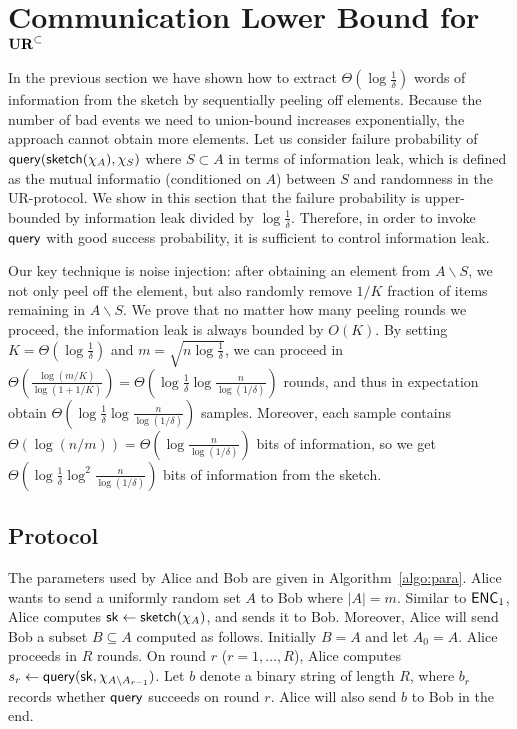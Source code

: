 \section{Communication Lower Bound for $\mathbf{UR}^\subset$} \label{sec:optimal-lb}

In the previous section we have shown how to extract $\Theta(\log \frac{1}{\delta})$ words of information from the sketch by sequentially peeling off elements. 
Because the number of bad events we need to union-bound increases exponentially, the approach cannot obtain more elements. 
Let us consider failure probability of $\mathsf{query}(\mathsf{sketch}(\chi_A), \chi_S)$ where $S\subset A$ in terms of information leak, which is defined as the mutual informatio (conditioned on $A$) between $S$ and randomness in the UR-protocol. 
We show in this section that the failure probability is upper-bounded by information leak divided by $\log \frac{1}{\delta}$. 
Therefore, in order to invoke $\mathsf{query}$ with good success probability, it is sufficient to control information leak.

Our key technique is noise injection: after obtaining an element from $A\backslash S$, we not only peel off the element, but also randomly remove $1/K$ fraction of items remaining in $A\backslash S$. 
We prove that no matter how many peeling rounds we proceed, the information leak is always bounded by $O(K)$. 
By setting $K=\Theta(\log \frac{1}{\delta})$ and $m=\sqrt{n\log\frac{1}{\delta}}$, we can proceed in $\Theta(\frac{\log (m/K)}{\log (1 +1/K)}) = \Theta(\log\frac{1}{\delta}\log\frac{n}{\log(1/\delta)})$ rounds, and thus in expectation obtain $\Theta(\log\frac{1}{\delta}\log\frac{n}{\log(1/\delta)})$ samples.
Moreover, each sample contains $\Theta(\log(n/m))=\Theta(\log \frac{n}{\log (1/\delta)})$ bits of information, so we get $\Theta(\log \frac{1}{\delta}\log^2 \frac{n}{\log (1/\delta)}) $ bits of information from the sketch. 

\subsection{Protocol}

The parameters used by Alice and Bob are given in Algorithm~\ref{algo:para}.
Alice wants to send a uniformly random set $A$ to Bob where $|A|=m$. Similar to $\textsf{ENC}_1$, Alice computes $\mathsf{sk} \leftarrow \mathsf{sketch}(\chi_A)$, and sends it to Bob. Moreover, Alice will send Bob a subset $B\subseteq A$ computed as follows. Initially $B=A$ and let $A_0=A$. Alice proceeds in $R$ rounds. On round $r$ ($r=1,\ldots, R$), Alice computes $s_r\leftarrow \mathsf{query}(\mathsf{sk}, \chi_{A\backslash A_{r-1}})$. 
Let $b$ denote a binary string of length $R$, where $b_r$ records whether $\mathsf{query}$ succeeds on round $r$. Alice will also send $b$ to Bob in the end.
 
